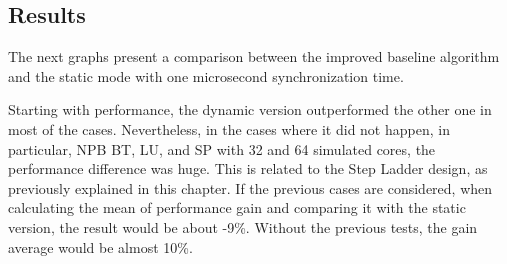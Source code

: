 \subsection{Results}

The next graphs present a comparison between the improved baseline algorithm and the static mode with one microsecond synchronization time. 

Starting with performance, the dynamic version outperformed the other one in most of the cases. Nevertheless, in the cases where it 
did not happen, in particular, NPB BT, LU, and SP with 32 and 64 simulated cores, the performance difference was huge. 
This is related to the Step Ladder design, as previously explained in this chapter. 
If the previous cases are considered,
when calculating the mean of performance gain and comparing it with the static version, the result would be about -9\%. Without the previous 
tests, the gain average would be almost 10\%. 


